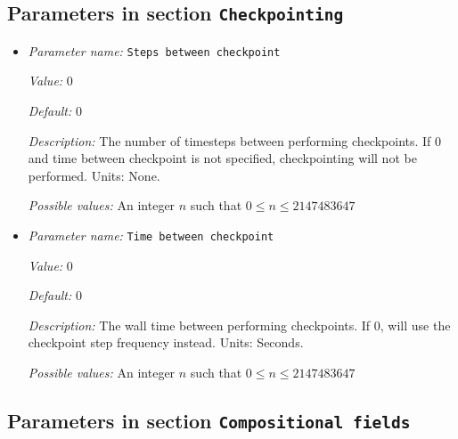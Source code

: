 \subsection{Parameters in section \tt Checkpointing}
\label{parameters:Checkpointing}

\begin{itemize}
\item {\it Parameter name:} {\tt Steps between checkpoint}
\label{parameters:Checkpointing/Steps between checkpoint}


{\it Value:} 0


{\it Default:} 0


{\it Description:} The number of timesteps between performing checkpoints. If 0 and time between checkpoint is not specified, checkpointing will not be performed. Units: None.


{\it Possible values:} An integer $n$ such that $0\leq n \leq 2147483647$
\item {\it Parameter name:} {\tt Time between checkpoint}
\label{parameters:Checkpointing/Time between checkpoint}


{\it Value:} 0


{\it Default:} 0


{\it Description:} The wall time between performing checkpoints. If 0, will use the checkpoint step frequency instead. Units: Seconds.


{\it Possible values:} An integer $n$ such that $0\leq n \leq 2147483647$
\end{itemize}

\subsection{Parameters in section \tt Compositional fields}
\label{parameters:Compositional_20fields}

